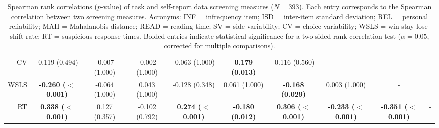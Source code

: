 \documentclass[a4paper,notitlepage,12pt]{article}
\begin{document}
\begin{table}[H]
\begin{adjustbox}{center}
\begin{tabular}{rccccccccc}
        CV   &              -0.119 (0.494) &              -0.007 (1.000) &              -0.002 (1.000) &             -0.063 (1.000) &   \textbf{0.179 (0.013)} &             -0.116 (0.560) &                           - &                             &    \\
        WSLS &  \textbf{-0.260 ($<$0.001)} &              -0.064 (1.000) &               0.043 (1.000) &             -0.128 (0.348) &            0.061 (1.000) &    \textbf{-0.168 (0.029)} &               0.003 (1.000) &                           - &    \\
        RT   &   \textbf{0.338 ($<$0.001)} &               0.127 (0.357) &              -0.102 (0.792) &  \textbf{0.274 ($<$0.001)} &  \textbf{-0.180 (0.012)} &  \textbf{0.306 ($<$0.001)} &  \textbf{-0.233 ($<$0.001)} &  \textbf{-0.351 ($<$0.001)} &  - \\
        \bottomrule
    \end{tabular}
    \end{adjustbox}
    \caption{Spearman rank correlations ($p$-value) of task and self-report data screening measures ($N=393$). Each entry corresponds to the Spearman correlation between two screening measures. Acronyms: INF = infrequency item; ISD = inter-item standard deviation; REL = personal reliability; MAH = Mahalanobis distance; READ = reading time; SV = side variability; CV = choice variability; WSLS = win-stay lose-shift rate; RT = suspicious response times. Bolded entries indicate statistical significance for a two-sided rank correlation test ($\alpha = 0.05$, corrected for multiple comparisons).}
\end{table}
\end{document}
